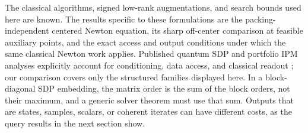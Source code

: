 The classical algorithms, signed low-rank augmentations, and search
bounds used here are known.  The results specific to these formulations
are the packing-independent centered Newton equation, its sharp
off-center comparison at feasible auxiliary points, and the exact access
and output conditions under which the same classical Newton work applies.  Published quantum SDP
and portfolio IPM analyses explicitly account for conditioning, data
access, and classical readout \citep{AugustinoEtAl2023,DalzellEtAl2023};
our comparison covers only the structured families displayed here.
In a block-diagonal SDP embedding, the matrix order is the sum of the
block orders, not their maximum, and a generic solver theorem must use
that sum.  Outputs that are
states, samples, scalars, or coherent iterates can have different costs,
as the query results in the next section show.
